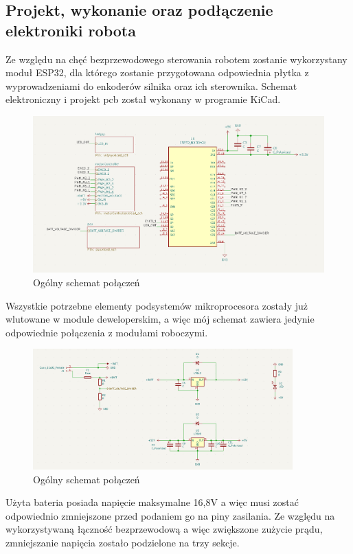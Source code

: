 \subsection{Projekt, wykonanie oraz podłączenie elektroniki robota}
Ze względu na chęć bezprzewodowego sterowania robotem zostanie wykorzystany moduł ESP32, dla którego zostanie przygotowana odpowiednia płytka 
z wyprowadzeniami do enkoderów silnika oraz ich sterownika. Schemat elektroniczny i projekt pcb został wykonany w programie KiCad. 
\begin{figure}[H]
	\centering
	\includegraphics[width=13cm]{pages/robot/zdjecia/kicad/schematCaly.png}
	\caption{Ogólny schemat połączeń}
	\label{Fig:Rysunek}
\end{figure}
Wszystkie potrzebne elementy podsystemów mikroprocesora zostały już wlutowane w module deweloperskim,
a więc mój schemat zawiera jedynie odpowiednie połączenia z modułami roboczymi.
\begin{figure}[H]
	\centering
	\includegraphics[width=10cm]{pages/robot/zdjecia/kicad/schematZasilanie.png}
	\caption{Ogólny schemat połączeń}
	\label{Fig:Rysunek}
\end{figure}
Użyta bateria posiada napięcie maksymalne 16,8V a więc musi zostać odpowiednio zmniejszone przed podaniem go na piny zasilania. 
Ze względu na wykorzystywaną łączność bezprzewodową a więc zwiększone zużycie prądu, zmniejszanie napięcia zostało podzielone na trzy sekcje. 
